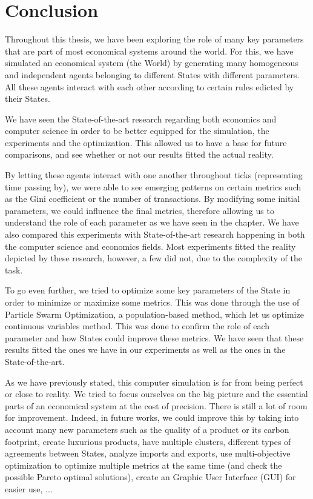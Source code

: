 \chapter{Conclusion}

Throughout this thesis, we have been exploring the role of many key parameters that are part of most economical systems around the world. For this, we have simulated an economical system (the World) by generating many homogeneous and independent agents belonging to different States with different parameters. All these agents interact with each other according to certain rules edicted by their States. 

We have seen the State-of-the-art research regarding both economics and computer science in order to be better equipped for the simulation, the experiments and the optimization. This allowed us to have a base for future comparisons, and see whether or not our results fitted the actual reality.

By letting these agents interact with one another throughout ticks (representing time passing by), we were able to see emerging patterns on certain metrics such as the Gini coefficient or the number of transactions. By modifying some initial parameters, we could influence the final metrics, therefore allowing us to understand the role of each parameter as we have seen in the  chapter. We have also compared this experiments with State-of-the-art research happening in both the computer science and economics fields. Most experiments fitted the reality depicted by these research, however, a few did not, due to the complexity of the task.

To go even further, we tried to optimize some key parameters of the State in order to minimize or maximize some metrics. This was done through the use of Particle Swarm Optimization, a population-based method, which let us optimize continuous variables method. This was done to confirm the role of each parameter and how States could improve these metrics. We have seen that these results fitted the ones we have in our experiments as well as the ones in the State-of-the-art.

As we have previously stated, this computer simulation is far from being perfect or close to reality. We tried to focus ourselves on the big picture and the essential parts of an economical system at the cost of precision. There is still a lot of room for improvement. Indeed, in future works, we could improve this by taking into account many new parameters such as the quality of a product or its carbon footprint,  create luxurious products, have multiple clusters, different types of agreements between States, analyze imports and exports, use multi-objective optimization to optimize multiple metrics at the same time (and check the possible Pareto optimal solutions), create an Graphic User Interface (GUI) for easier use, ...